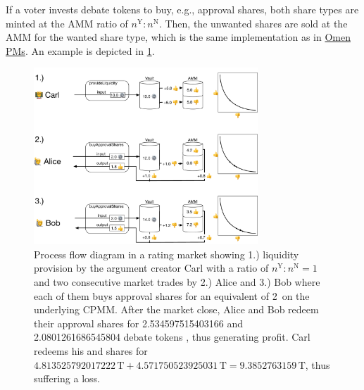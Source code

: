 \documentclass[%
aip,
amsmath,amssymb,
reprint,%
unsortedaddress,
nofootinbib
]{revtex4-2}
\newcommand{\T}{\text{T}}
\newcommand{\Y}{\text{Y}}
\newcommand{\N}{\text{N}}
\begin{document}
If a voter invests debate tokens to buy, e.g., approval shares,
both share types are minted at the  \ac{AMM} ratio of $n^\Y: n^\N$.
Then, the unwanted shares are sold at the \ac{AMM} for the wanted share type, 
which is the same implementation as in 
\href{https://omen.eth.link/}{Omen \acp{PM}}\cite{Omen2020}.
An example is depicted in \cref{fig:RatingMarket}.
\begin{figure}
	\includegraphics[width=0.75\textwidth]{Graphics/RatingMarket.pdf}
	\caption{Process flow diagram in a rating market showing
	1.) liquidity provision by the argument creator Carl with a ratio of $n^\Y:n^\N=1$
	and 
	two consecutive market trades by 
	2.) Alice and 
	3.) Bob where each of them buys approval shares for an equivalent of 2\,\T{} on the underlying \ac{CPMM}.
	After the market close, 
	Alice and Bob redeem their approval shares \Y{} for \num[round-mode=places,round-precision=1]{2.534597515403166}
	and
	\num[round-mode=places,round-precision=1]{2.0801261686545804}
	debate tokens \T{}, thus generating profit.
	Carl redeems his \Y{} and \N{} shares for
	$\num[round-mode=places,round-precision=1]{4.813525792017222}\,\T
	+\num[round-mode=places,round-precision=1]{4.571750523925031}\,\T
	=\num[round-mode=places,round-precision=1]{9.3852763159}\,\T$, thus suffering a loss.
}
	\label{fig:RatingMarket}
\end{figure}




\end{document}
